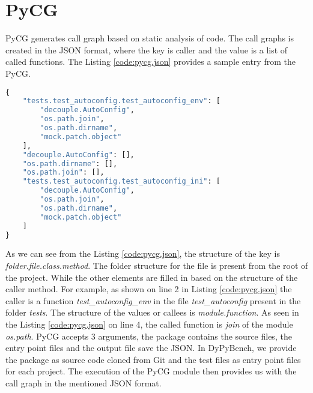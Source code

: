 \section{PyCG}
PyCG generates call graph based on static analysis of code.
The call graphs is created in the JSON format, where the key is caller and the value is a list of called functions.
The Listing \ref{code:pycg.json} provides a sample entry from the PyCG.
\begin{lstlisting}[caption=Key-Value Pair in PyCG.,label=code:pycg.json,language=python]
{
    "tests.test_autoconfig.test_autoconfig_env": [
        "decouple.AutoConfig",
        "os.path.join",
        "os.path.dirname",
        "mock.patch.object"
    ],
    "decouple.AutoConfig": [],
    "os.path.dirname": [],
    "os.path.join": [],
    "tests.test_autoconfig.test_autoconfig_ini": [
        "decouple.AutoConfig",
        "os.path.join",
        "os.path.dirname",
        "mock.patch.object"
    ]
}
\end{lstlisting}

As we can see from the Listing \ref{code:pycg.json}, the structure of the key is \textit{folder.file.class.method}.
The folder structure for the file is present from the root of the project.
While the other elements are filled in based on the structure of the caller method.
For example, as shown on line 2 in Listing \ref{code:pycg.json} the caller is a function \textit{test\_autoconfig\_env} in the file \textit{test\_autoconfig} present in the folder \textit{tests}.
The structure of the values or callees is \textit{module.function}.
As seen in the Listing \ref{code:pycg.json} on line 4, the called function is \textit{join} of the module \textit{os.path}.
PyCG accepts 3 arguments, the package contains the source files, the entry point files and the output file save the JSON.
In DyPyBench, we provide the package as source code cloned from Git and the test files as entry point files for each project.
The execution of the PyCG module then provides us with the call graph in the mentioned JSON format.

